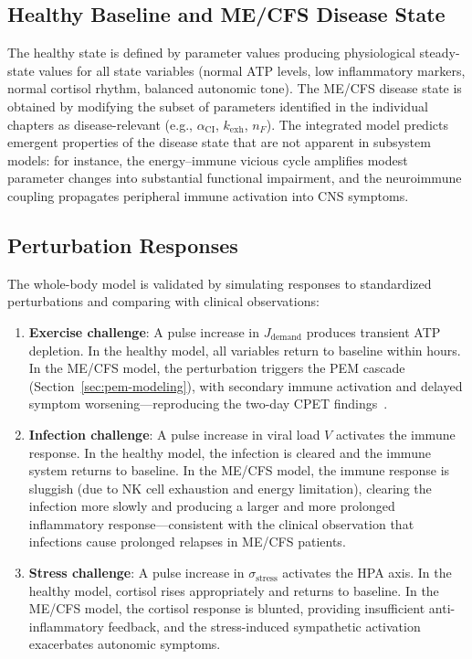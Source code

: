 \subsection{Healthy Baseline and ME/CFS Disease State}
\label{sec:baseline-disease}

The healthy state is defined by parameter values producing physiological steady-state values for all state variables (normal ATP levels, low inflammatory markers, normal cortisol rhythm, balanced autonomic tone). The ME/CFS disease state is obtained by modifying the subset of parameters identified in the individual chapters as disease-relevant (e.g., $\alpha_{\text{CI}}$, $k_{\text{exh}}$, $n_F$). The integrated model predicts emergent properties of the disease state that are not apparent in subsystem models: for instance, the energy--immune vicious cycle amplifies modest parameter changes into substantial functional impairment, and the neuroimmune coupling propagates peripheral immune activation into CNS symptoms.

\subsection{Perturbation Responses}
\label{sec:perturbation-responses}

The whole-body model is validated by simulating responses to standardized perturbations and comparing with clinical observations:

\begin{enumerate}
    \item \textbf{Exercise challenge}: A pulse increase in $J_{\text{demand}}$ produces transient ATP depletion. In the healthy model, all variables return to baseline within hours. In the ME/CFS model, the perturbation triggers the PEM cascade (Section~\ref{sec:pem-modeling}), with secondary immune activation and delayed symptom worsening---reproducing the two-day CPET findings~\cite{keller2024cpet}.
    \item \textbf{Infection challenge}: A pulse increase in viral load $V$ activates the immune response. In the healthy model, the infection is cleared and the immune system returns to baseline. In the ME/CFS model, the immune response is sluggish (due to NK cell exhaustion and energy limitation), clearing the infection more slowly and producing a larger and more prolonged inflammatory response---consistent with the clinical observation that infections cause prolonged relapses in ME/CFS patients.
    \item \textbf{Stress challenge}: A pulse increase in $\sigma_{\text{stress}}$ activates the HPA axis. In the healthy model, cortisol rises appropriately and returns to baseline. In the ME/CFS model, the cortisol response is blunted, providing insufficient anti-inflammatory feedback, and the stress-induced sympathetic activation exacerbates autonomic symptoms.
\end{enumerate}

